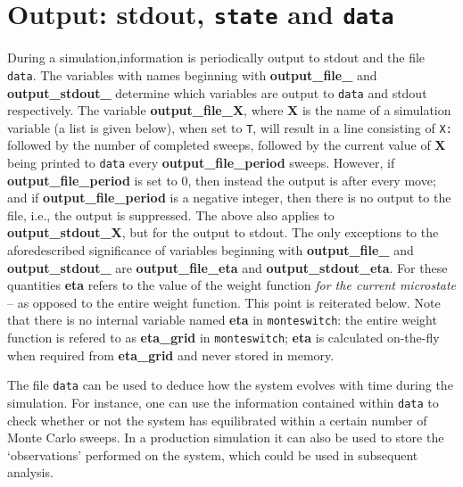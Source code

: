 \documentclass{report}
\begin{document}
\section{Output: stdout, \texttt{state} and \texttt{data}}\label{sec:output}
During a simulation,information is periodically output to stdout and the file \texttt{data}. The variables with names beginning with 
\textbf{output\_file\_} and \textbf{output\_stdout\_} determine which variables are output to \texttt{data} and stdout respectively.
The variable \textbf{output\_file\_X}, where \textbf{X} is the name of a simulation variable (a list is given below), when set to \texttt{T}, 
will result in a line consisting of \texttt{X: } followed by the number of completed sweeps, followed by the current value of \textbf{X} 
being printed to \texttt{data} every \textbf{output\_file\_period} sweeps. However, if \textbf{output\_file\_period} is set to 0, then instead 
the output is after every move; and if \textbf{output\_file\_period} is a negative integer, then there is no output to the file, i.e., the
output is suppressed. The above also applies to \textbf{output\_stdout\_X}, but for the output to stdout. 
The only exceptions to the aforedescribed significance of variables beginning with \textbf{output\_file\_} and \textbf{output\_stdout\_}
are \textbf{output\_file\_eta} and \textbf{output\_stdout\_eta}. For these quantities \textbf{eta} refers to the
value of the weight function \emph{for the current microstate} -- as opposed to the entire weight function. This point is reiterated below.
Note that there is no internal variable named \textbf{eta} in \verb|monteswitch|: the entire weight function is refered to as \textbf{eta\_grid}
in \verb|monteswitch|; \textbf{eta} is calculated on-the-fly when required from \textbf{eta\_grid} and never stored in memory.

The file \texttt{data} can be used to deduce how the system evolves with time during the simulation. For instance, one can use the information contained 
within \texttt{data} to check whether or not the system has equilibrated within a certain number of Monte Carlo sweeps. In a production simulation it
can also be used to store the `observations' performed on the system, which could be used in subsequent analysis.
\end{document}
